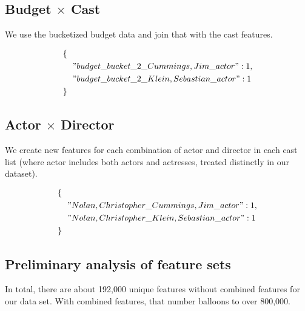 \documentclass[journal]{IEEEtran}
\begin{document}
\subsection{Budget $\times$ Cast}
We use the bucketized budget data and join that with the cast features.

\begin{align*}
        \{\ \ &\\
        &"budget\_bucket\_2\_Cummings,Jim\_actor": 1,\\
        &"budget\_bucket\_2\_Klein,Sebastian\_actor": 1\\
        \}\ \ &
\end{align*}

\subsection{Actor $\times$ Director}
We create new features for each combination of actor and director in each cast
list (where actor includes both actors and actresses, treated distinctly in our
dataset).

\begin{align*}
        \{\ \ &\\
        &"Nolan,Christopher\_Cummings,Jim\_actor": 1,\\
        &"Nolan,Christopher\_Klein,Sebastian\_actor": 1\\
        \}\ \ &
\end{align*}

\subsection*{Preliminary analysis of feature sets}
In total, there are about 192,000 unique features without combined features for
our data set.  With combined features, that number balloons to over 800,000.

\end{document}
